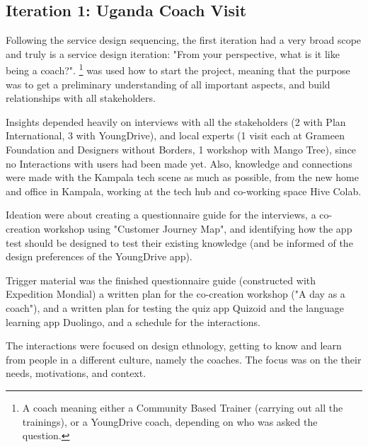 \subsection{Iteration 1: Uganda Coach Visit}


Following the service design sequencing, the first iteration had a very broad scope and truly is a service design iteration: "From your perspective, what is it like being a coach?". \footnote{A coach meaning either a Community Based Trainer (carrying out all the trainings), or a YoungDrive coach, depending on who was asked the question.} \cite{lowgren} was used how to start the project, meaning that the purpose was to get a preliminary understanding of all important aspects, and build relationships with all stakeholders.


Insights depended heavily on interviews with all the stakeholders  (2 with Plan International, 3 with YoungDrive), and local experts (1 visit each at Grameen Foundation and Designers without Borders, 1 workshop with Mango Tree), since no Interactions with users had been made yet. Also, knowledge and connections were made with the Kampala tech scene as much as possible, from the new home and office in Kampala, working at the tech hub and co-working space Hive Colab.

Ideation were about creating a questionnaire guide for the interviews, a co-creation workshop using "Customer Journey Map", and identifying how the app test should be designed to test their existing knowledge (and be informed of the design preferences of the YoungDrive app).

Trigger material was the finished questionnaire guide (constructed with Expedition Mondial) a written plan for the co-creation workshop ("A day as a coach"), and a written plan for testing the quiz app Quizoid and the language learning app Duolingo, and a schedule for the interactions.

The interactions were focused on design ethnology, getting to know and learn from people in a different culture, namely the coaches. The focus was on the their needs, motivations, and context.


